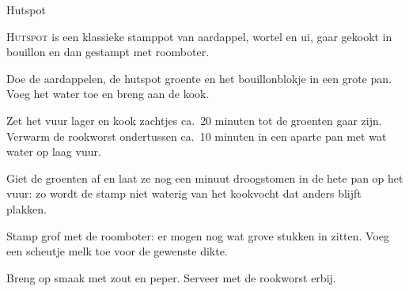 \begin{recipe}{Hutspot}


\lettrine{H}{utspot} is een klassieke stamppot van aardappel, wortel en ui,
gaar gekookt in bouillon en dan gestampt met roomboter.

\begin{ingredients}
\end{ingredients}

\begin{steps}
  \item Doe de aardappelen, de hutspot groente en het bouillonblokje in een grote pan.
        Voeg het water toe en breng aan de kook.
  \item Zet het vuur lager en kook zachtjes ca.\ 20 minuten tot de groenten gaar
        zijn. Verwarm de rookworst ondertussen ca.\ 10 minuten in een aparte pan
        met wat water op laag vuur.
  \item Giet de groenten af en laat ze nog een minuut droogstomen in de hete pan
        op het vuur: zo wordt de stamp niet waterig van het kookvocht dat
        anders blijft plakken.
  \item Stamp grof met de roomboter: er mogen nog wat grove stukken in zitten.
        Voeg een scheutje melk toe voor de gewenste dikte.
  \item Breng op smaak met zout en peper. Serveer met de rookworst erbij.
\end{steps}
\end{recipe}
